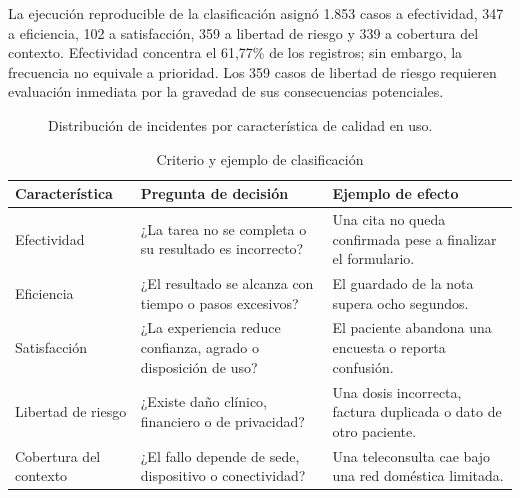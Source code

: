 La ejecución reproducible de la clasificación asignó 1.853 casos a efectividad, 347 a eficiencia, 102 a satisfacción, 359 a libertad de riesgo y 339 a cobertura del contexto. Efectividad concentra el 61,77\% de los registros; sin embargo, la frecuencia no equivale a prioridad. Los 359 casos de libertad de riesgo requieren evaluación inmediata por la gravedad de sus consecuencias potenciales.

\begin{figure}[H]
\centering
{}
\caption{Distribución de incidentes por característica de calidad en uso.}
\label{fig:classification}
\end{figure}

\begin{table}[H]
\centering
\caption{Criterio y ejemplo de clasificación}
\begin{tabularx}{\textwidth}{p{3.2cm}YY}
\toprule
Característica & Pregunta de decisión & Ejemplo de efecto \\
\midrule
Efectividad & ¿La tarea no se completa o su resultado es incorrecto? & Una cita no queda confirmada pese a finalizar el formulario. \\
Eficiencia & ¿El resultado se alcanza con tiempo o pasos excesivos? & El guardado de la nota supera ocho segundos. \\
Satisfacción & ¿La experiencia reduce confianza, agrado o disposición de uso? & El paciente abandona una encuesta o reporta confusión. \\
Libertad de riesgo & ¿Existe daño clínico, financiero o de privacidad? & Una dosis incorrecta, factura duplicada o dato de otro paciente. \\
Cobertura del contexto & ¿El fallo depende de sede, dispositivo o conectividad? & Una teleconsulta cae bajo una red doméstica limitada. \\
\bottomrule
\end{tabularx}
\end{table}

